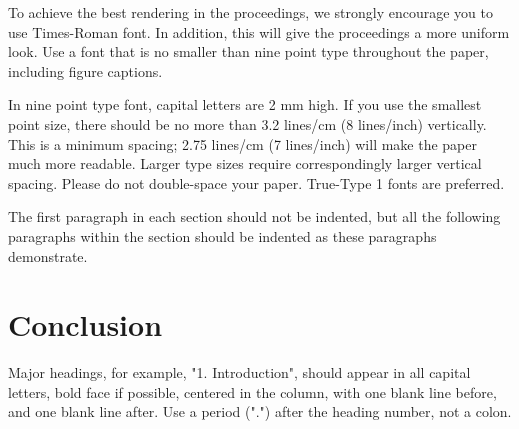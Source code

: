 \documentclass{article}
\begin{document}
To achieve the best rendering in the proceedings, we
strongly encourage you to use Times-Roman font.  In addition, this will give
the proceedings a more uniform look.  Use a font that is no smaller than nine
point type throughout the paper, including figure captions.

In nine point type font, capital letters are 2 mm high.  If you use the
smallest point size, there should be no more than 3.2 lines/cm (8 lines/inch)
vertically.  This is a minimum spacing; 2.75 lines/cm (7 lines/inch) will make
the paper much more readable.  Larger type sizes require correspondingly larger
vertical spacing.  Please do not double-space your paper.  True-Type 1 fonts
are preferred.

The first paragraph in each section should not be indented, but all the
following paragraphs within the section should be indented as these paragraphs
demonstrate.

\section{Conclusion}
\label{sec:concl}

Major headings, for example, "1. Introduction", should appear in all capital
letters, bold face if possible, centered in the column, with one blank line
before, and one blank line after. Use a period (".") after the heading number,
not a colon.





\end{document}
